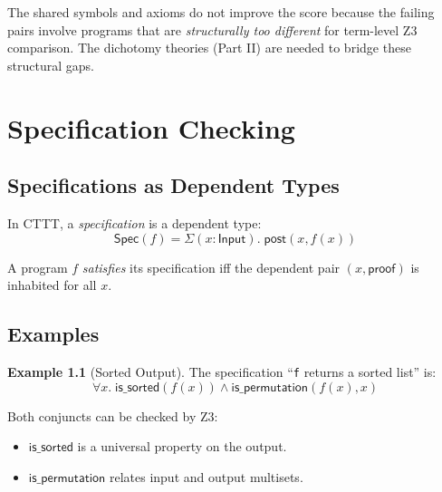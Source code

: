 \documentclass[11pt,a4paper]{report}
\theoremstyle{definition}
\newtheorem{example}[definition]{Example}
\theoremstyle{plain}
\begin{document}
The shared symbols and axioms do not improve the score because the
failing pairs involve programs that are \emph{structurally too different}
for term-level Z3 comparison.  The dichotomy theories (Part II) are
needed to bridge these structural gaps.


\chapter{Specification Checking}
\label{ch:speccheck}

\section{Specifications as Dependent Types}

In CTTT, a \emph{specification} is a dependent type:
\[
  \mathsf{Spec}(f) = \Sigma(x : \mathsf{Input}).\;
  \mathsf{post}(x, f(x))
\]

A program $f$ \emph{satisfies} its specification iff the dependent
pair $(x, \mathsf{proof})$ is inhabited for all $x$.

\section{Examples}

\begin{example}[Sorted Output]
The specification ``\texttt{f} returns a sorted list'' is:
\[
  \forall x.\; \mathsf{is\_sorted}(f(x)) \land
  \mathsf{is\_permutation}(f(x), x)
\]

Both conjuncts can be checked by Z3:
\begin{itemize}
  \item $\mathsf{is\_sorted}$ is a universal property on the output.
  \item $\mathsf{is\_permutation}$ relates input and output multisets.
\end{itemize}
\end{example}


\end{document}
